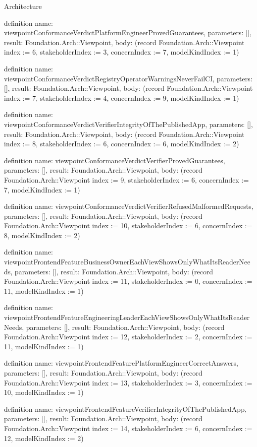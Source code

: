 \begin{lexlean}{Architecture}
\begin{semanticmodule}
definition{
  name: viewpointConformanceVerdictPlatformEngineerProvedGuarantees,
  parameters: [],
  result: Foundation.Arch::Viewpoint,
  body: (record Foundation.Arch::Viewpoint {index := 6, stakeholderIndex := 3, concernIndex := 7, modelKindIndex := 1})
}

definition{
  name: viewpointConformanceVerdictRegistryOperatorWarningsNeverFailCI,
  parameters: [],
  result: Foundation.Arch::Viewpoint,
  body: (record Foundation.Arch::Viewpoint {index := 7, stakeholderIndex := 4, concernIndex := 9, modelKindIndex := 1})
}

definition{
  name: viewpointConformanceVerdictVerifierIntegrityOfThePublishedApp,
  parameters: [],
  result: Foundation.Arch::Viewpoint,
  body: (record Foundation.Arch::Viewpoint {index := 8, stakeholderIndex := 6, concernIndex := 6, modelKindIndex := 2})
}

definition{
  name: viewpointConformanceVerdictVerifierProvedGuarantees,
  parameters: [],
  result: Foundation.Arch::Viewpoint,
  body: (record Foundation.Arch::Viewpoint {index := 9, stakeholderIndex := 6, concernIndex := 7, modelKindIndex := 1})
}

definition{
  name: viewpointConformanceVerdictVerifierRefusedMalformedRequests,
  parameters: [],
  result: Foundation.Arch::Viewpoint,
  body: (record Foundation.Arch::Viewpoint {index := 10, stakeholderIndex := 6, concernIndex := 8, modelKindIndex := 2})
}

definition{
  name: viewpointFrontendFeatureBusinessOwnerEachViewShowsOnlyWhatItsReaderNeeds,
  parameters: [],
  result: Foundation.Arch::Viewpoint,
  body: (record Foundation.Arch::Viewpoint {index := 11, stakeholderIndex := 0, concernIndex := 11, modelKindIndex := 1})
}

definition{
  name: viewpointFrontendFeatureEngineeringLeaderEachViewShowsOnlyWhatItsReaderNeeds,
  parameters: [],
  result: Foundation.Arch::Viewpoint,
  body: (record Foundation.Arch::Viewpoint {index := 12, stakeholderIndex := 2, concernIndex := 11, modelKindIndex := 1})
}

definition{
  name: viewpointFrontendFeaturePlatformEngineerCorrectAnswers,
  parameters: [],
  result: Foundation.Arch::Viewpoint,
  body: (record Foundation.Arch::Viewpoint {index := 13, stakeholderIndex := 3, concernIndex := 10, modelKindIndex := 1})
}

definition{
  name: viewpointFrontendFeatureVerifierIntegrityOfThePublishedApp,
  parameters: [],
  result: Foundation.Arch::Viewpoint,
  body: (record Foundation.Arch::Viewpoint {index := 14, stakeholderIndex := 6, concernIndex := 12, modelKindIndex := 2})
}


\end{semanticmodule}
\end{lexlean}
